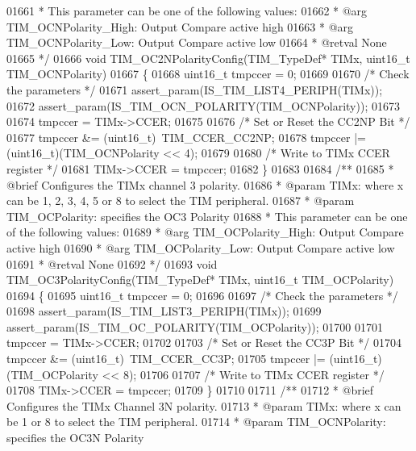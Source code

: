 \begin{DoxyCode}
01661 \textcolor{comment}{  *          This parameter can be one of the following values:}
01662 \textcolor{comment}{  *            @arg TIM\_OCNPolarity\_High: Output Compare active high}
01663 \textcolor{comment}{  *            @arg TIM\_OCNPolarity\_Low: Output Compare active low}
01664 \textcolor{comment}{  * @retval None}
01665 \textcolor{comment}{  */}
01666 \textcolor{keywordtype}{void} TIM_OC2NPolarityConfig(TIM\_TypeDef* TIMx, uint16\_t TIM\_OCNPolarity)
01667 \{
01668   uint16\_t tmpccer = 0;
01669 
01670   \textcolor{comment}{/* Check the parameters */}
01671   assert_param(IS\_TIM\_LIST4\_PERIPH(TIMx));
01672   assert_param(IS\_TIM\_OCN\_POLARITY(TIM\_OCNPolarity));
01673 
01674   tmpccer = TIMx->CCER;
01675 
01676   \textcolor{comment}{/* Set or Reset the CC2NP Bit */}
01677   tmpccer &= (uint16\_t)~TIM_CCER_CC2NP;
01678   tmpccer |= (uint16\_t)(TIM\_OCNPolarity << 4);
01679 
01680   \textcolor{comment}{/* Write to TIMx CCER register */}
01681   TIMx->CCER = tmpccer;
01682 \}
01683 
01684 \textcolor{comment}{/**}
01685 \textcolor{comment}{  * @brief  Configures the TIMx channel 3 polarity.}
01686 \textcolor{comment}{  * @param  TIMx: where x can be 1, 2, 3, 4, 5 or 8 to select the TIM peripheral.}
01687 \textcolor{comment}{  * @param  TIM\_OCPolarity: specifies the OC3 Polarity}
01688 \textcolor{comment}{  *          This parameter can be one of the following values:}
01689 \textcolor{comment}{  *            @arg TIM\_OCPolarity\_High: Output Compare active high}
01690 \textcolor{comment}{  *            @arg TIM\_OCPolarity\_Low: Output Compare active low}
01691 \textcolor{comment}{  * @retval None}
01692 \textcolor{comment}{  */}
01693 \textcolor{keywordtype}{void} TIM_OC3PolarityConfig(TIM\_TypeDef* TIMx, uint16\_t TIM\_OCPolarity)
01694 \{
01695   uint16\_t tmpccer = 0;
01696 
01697   \textcolor{comment}{/* Check the parameters */}
01698   assert_param(IS\_TIM\_LIST3\_PERIPH(TIMx));
01699   assert_param(IS\_TIM\_OC\_POLARITY(TIM\_OCPolarity));
01700 
01701   tmpccer = TIMx->CCER;
01702 
01703   \textcolor{comment}{/* Set or Reset the CC3P Bit */}
01704   tmpccer &= (uint16\_t)~TIM_CCER_CC3P;
01705   tmpccer |= (uint16\_t)(TIM\_OCPolarity << 8);
01706 
01707   \textcolor{comment}{/* Write to TIMx CCER register */}
01708   TIMx->CCER = tmpccer;
01709 \}
01710 
01711 \textcolor{comment}{/**}
01712 \textcolor{comment}{  * @brief  Configures the TIMx Channel 3N polarity.}
01713 \textcolor{comment}{  * @param  TIMx: where x can be 1 or 8 to select the TIM peripheral.}
01714 \textcolor{comment}{  * @param  TIM\_OCNPolarity: specifies the OC3N Polarity}

\end{DoxyCode}

